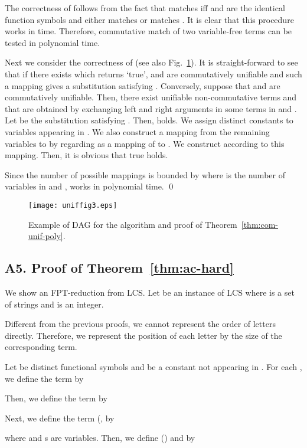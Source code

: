 \documentclass[a4paper]{llncs}
\begin{document}
The correctness of  follows from the fact
that  matches  iff
 and  are the identical function symbols and
either  matches  or 
 matches .
It is clear that this procedure works in  time.
Therefore, commutative match of two variable-free terms can be tested in 
polynomial time.

Next we consider the correctness of 
(see also Fig.~\ref{fig:dag}).
It is straight-forward to see that if there exists  which returns `true',
 and  are commutatively unifiable and such a mapping
gives a substitution  satisfying .
Conversely, suppose that
 and  are commutatively unifiable.
Then,
there exist unifiable non-commutative terms  and 
that are obtained by exchanging
left and right arguments in some terms in  and .
Let  be the substitution satisfying .
Then,  holds.
We assign distinct constants to variables appearing in .
We also construct a mapping from the remaining variables to 
by regarding  as a mapping of  to .
We construct  according to this mapping.
Then, it is obvious that true holds.

Since the number of possible mappings is bounded by 
where  is the number of variables in  and ,
 works in polynomial time.
\qed

\begin{figure}[ht]
\begin{center}
\texttt{[image: uniffig3.eps]}
\caption{Example of DAG  for the algorithm and proof of Theorem~\ref{thm:com-unif-poly}.}
\label{fig:dag}
\end{center}
\end{figure}

\subsection*{A5. Proof of Theorem~\ref{thm:ac-hard}}

We show an FPT-reduction from LCS.
Let  be an instance of LCS
where  is a set of strings and  is an integer.

Different from the previous proofs,
we cannot represent the order of letters directly.
Therefore, we represent the position of each letter by
the size of the corresponding term.

Let  be distinct functional symbols
and  be a constant not appearing in .
For each ,
we define the term  by

Then, we define the term  by


Next, we define the term  (,  by

where  and s are variables.
Then, we define  () and  by
\end{document}
